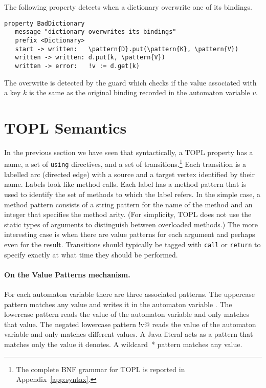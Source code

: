 \documentclass[10pt, preprint]{sigplanconf} %
\newcommand{\delimitVerbatim}{\par\nobreak\smallskip\noindent}
\newcommand{\pattern}[1]{\ensuremath{\mathtt{\underline{#1}}}}
\begin{document}
The following property detects when a dictionary overwrite one of its bindings.
\delimitVerbatim
\begin{Verbatim}[commandchars=\\\{\}]
 property BadDictionary
   message "dictionary overwrites its bindings"
   prefix <Dictionary>
   start -> written:   \pattern{D}.put(\pattern{K}, \pattern{V})
   written -> written: d.put(k, \pattern{V})
   written -> error:   !v := d.get(k)
\end{Verbatim}
\delimitVerbatim
The overwrite is detected by the guard which checks if the value associated with a key $k$ is the same as the original binding recorded in the automaton variable $v$.

\section{TOPL  Semantics} %
\label{sec:syntax}
In the previous section we have seen that syntactically, a TOPL property has a name, a set of \texttt{using} directives, and a set of transitions.\footnote{The complete BNF grammar for TOPL is reported in Appendix~\ref{app:syntax}.}
Each transition is a labelled arc (directed edge) with a source and a target vertex identified by their name.
Labels look like method calls.
Each label has a method pattern that is used to identify the set of methods to which the label refers.
In the simple case, a method pattern consists of a string pattern for the name of the method and an integer that specifies the method arity.
(For simplicity, TOPL does not use the static types of arguments to distinguish between overloaded methods.)
The more interesting case is when there are value patterns for each argument and perhaps even for the result.
Transitions should typically be tagged with \texttt{call} or \texttt{return} to specify exactly at what time they should be performed.

\paragraph{On the Value Patterns mechanism.}
For each automaton variable \Verb@v@ there are three associated patterns.
The uppercase pattern \Verb@V@ matches any value and writes it in the automaton variable \Verb@v@.
The lowercase pattern \Verb@v@ reads the value of the automaton variable \Verb@v@ and only matches that value.
The negated lowercase pattern \Verb@!v@ reads the value of the automaton variable \Verb@v@ and only matches different values.
A Java literal acts as a pattern that matches only the value it denotes.
A wildcard~* pattern matches any value.
\end{document}
